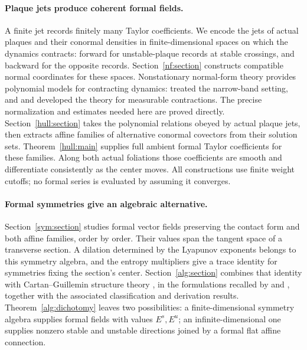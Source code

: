 \documentclass[11pt,a4paper]{article}
\theoremstyle{definition}
\theoremstyle{remark}
\numberwithin{equation}{section}
\begin{document}
\paragraph{Plaque jets produce coherent formal fields.}
A finite jet records finitely many Taylor coefficients. We encode the
jets of actual plaques and their conormal densities in finite-dimensional
spaces on which the dynamics contracts: forward for unstable-plaque
records at stable crossings, and backward for the opposite records.
Section~\ref{nf:section} constructs compatible normal coordinates for
these spaces. Nonstationary normal-form theory provides polynomial
models for contracting dynamics: \citet{GuysinskyKatok1998} treated the
narrow-band setting, and \citet{Melnick2019} and
\citet{KalininSadovskaya2017} developed the theory for measurable
contractions. The precise normalization and estimates needed here
are proved directly.
Section~\ref{hull:section} takes the polynomial relations obeyed by actual
plaque jets, then extracts affine families of alternative conormal
covectors from their solution sets. Theorem~\ref{hull:main} supplies
full ambient formal Taylor coefficients for these families. Along both
actual foliations those coefficients are smooth and differentiate
consistently as the center moves. All constructions use finite weight
cutoffs; no formal series is evaluated by assuming it converges.

\paragraph{Formal symmetries give an algebraic alternative.}
Section~\ref{sym:section} studies formal vector fields preserving the
contact form and both affine families, order by order. Their values
span the tangent space of a transverse section. A dilation determined
by the Lyapunov exponents belongs to this symmetry algebra, and the
entropy multipliers give a trace identity for symmetries fixing the
section's center. Section~\ref{alg:section} combines that identity with
Cartan--Guillemin structure theory \citep{Guillemin1968}, in the
formulations recalled by \citet{BakalovDAndreaKac2001} and
\citet{FattoriKac2002}, together with the associated classification
and derivation results.
Theorem~\ref{alg:dichotomy} leaves two possibilities: a finite-dimensional
symmetry algebra supplies formal fields with values $E^s,E^u$;
an infinite-dimensional one supplies nonzero stable and unstable
directions joined by a formal flat affine connection.
\end{document}
